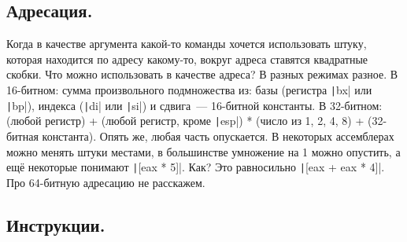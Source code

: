 \documentclass{article}
\begin{document}
    \subsection{Адресация.}
    Когда в качестве аргумента какой-то команды хочется использовать штуку, которая находится по адресу какому-то, вокруг адреса ставятся квадратные скобки. Что можно использовать в качестве адреса? В разных режимах разное. В 16-битном: сумма произвольного подмножества из: базы (регистра \texttt|bx| или \texttt|bp|), индекса (\texttt|di| или \texttt|si|) и сдвига~--- 16-битной константы. В 32-битном: (любой регистр) + (любой регистр, кроме \texttt|esp|) * (число из 1, 2, 4, 8) + (32-битная константа). Опять же, любая часть опускается. В некоторых ассемблерах можно менять штуки местами, в большинстве умножение на 1 можно опустить, а ещё некоторые понимают \texttt|[eax * 5]|. Как? Это равносильно \texttt|[eax + eax * 4]|. Про 64-битную адресацию не расскажем.
    \subsection{Инструкции.}
\end{document}
